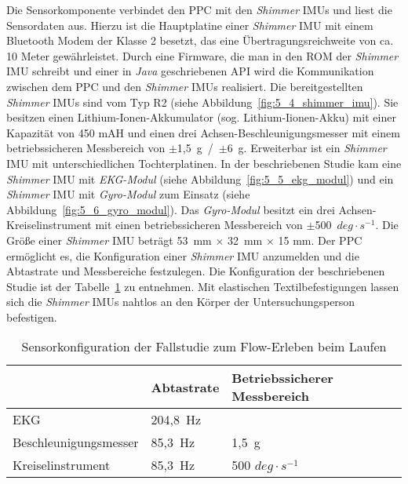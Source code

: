 Die Sensorkomponente verbindet den \ac{PPC} mit den \emph{Shimmer} \acp{IMU} und liest die Sensordaten aus. Hierzu ist die Hauptplatine einer \emph{Shimmer} \ac{IMU} mit einem Bluetooth Modem der Klasse 2 besetzt, das eine Übertragungsreichweite von ca. 10 Meter gewährleistet. Durch eine Firmware, die man in den \acs{ROM} der \emph{Shimmer} \ac{IMU} schreibt und einer in \emph{Java} geschriebenen \acs{API} wird die Kommunikation zwischen dem \ac{PPC} und den \emph{Shimmer} \acp{IMU} realisiert. Die bereitgestellten \emph{Shimmer} \acp{IMU} sind vom Typ R2 (siehe Abbildung~\ref{fig:5_4_shimmer_imu}). Sie besitzen einen Lithium-Ionen-Akkumulator (sog. Lithium-Iionen-Akku) mit einer Kapazität von 450 mAH und einen drei Achsen-Beschleunigungsmesser mit einem betriebssicheren Messbereich von \mbox{$\pm$1,5~g / $\pm$6 g}. Erweiterbar ist ein \emph{Shimmer} \ac{IMU} mit unterschiedlichen Tochterplatinen. In der beschriebenen Studie kam eine \emph{Shimmer} \ac{IMU} mit \emph{EKG-Modul} (siehe Abbildung~\ref{fig:5_5_ekg_modul}) und ein \emph{Shimmer} \ac{IMU} mit \emph{Gyro-Modul} zum Einsatz (siehe Abbildung~\ref{fig:5_6_gyro_modul}). Das \emph{Gyro-Modul} besitzt ein drei Achsen-Kreiselinstrument mit einen betriebssicheren Messbereich von \mbox{$\pm$500 $deg \cdot s^{-1}$}. Die Größe einer \emph{Shimmer} \ac{IMU} beträgt 53~mm $\times$ 32~mm $\times$ 15 mm. Der \ac{PPC} ermöglicht es, die Konfiguration einer \emph{Shimmer} \ac{IMU} anzumelden und die Abtastrate und Messbereiche festzulegen. Die Konfiguration der beschriebenen Studie ist der Tabelle~\ref{tab:sensorkonfiguration_fallstudie_laufen} zu entnehmen. Mit elastischen Textilbefestigungen lassen sich die \emph{Shimmer} \acp{IMU} nahtlos an den Körper der Untersuchungsperson befestigen.

\begin{table}[t]
	\caption[Sensorkonfiguration der Fallstudie zum Flow-Erleben beim Laufen]{Sensorkonfiguration der Fallstudie zum Flow-Erleben beim Laufen}
	\label{tab:sensorkonfiguration_fallstudie_laufen}
	\begin{tabularx}{\textwidth}{p{} p{} p{}}
\toprule
& Abtastrate & Betriebssicherer Messbereich \\
\midrule
EKG & 204,8~Hz & \\
Beschleunigungsmesser & 85,3~Hz & 1,5~g \\
Kreiselinstrument & 85,3~Hz & 500 $deg \cdot s^{-1}$ \\
\bottomrule
\end{tabularx}
\end{table}

